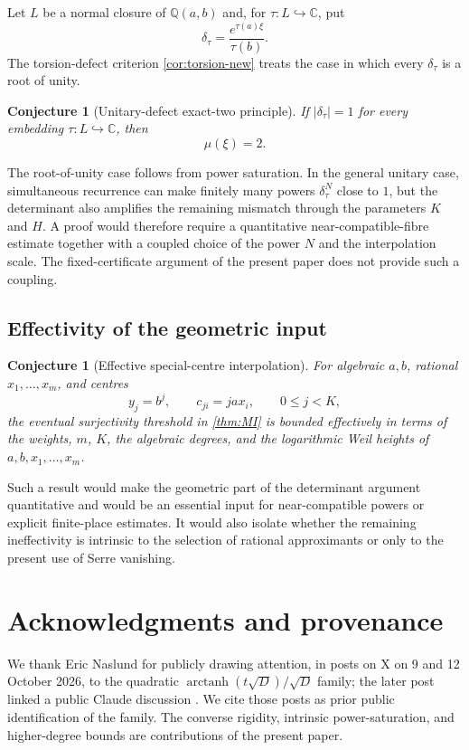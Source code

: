 \documentclass[11pt]{article}
\newcommand{\CC}{\mathbb C}
\newcommand{\QQ}{\mathbb Q}
\DeclareMathOperator{\arctanh}{arctanh}
\newtheorem{conjecture}[theorem]{Conjecture}
\theoremstyle{definition}
\theoremstyle{remark}
\numberwithin{equation}{section}
\begin{document}
Let $L$ be a normal closure of $\QQ(a,b)$ and, for
$\tau:L\hookrightarrow\CC$, put
\[
 \delta_\tau=\frac{e^{\tau(a)\xi}}{\tau(b)}.
\]
The torsion-defect criterion \cref{cor:torsion-new} treats the case in
which every $\delta_\tau$ is a root of unity.

\begin{conjecture}[Unitary-defect exact-two principle]
\label{conj:unitary-defect}
If $|\delta_\tau|=1$ for every embedding $\tau:L\hookrightarrow\CC$,
then
\[
 \boxed{\mu(\xi)=2.}
\]
\end{conjecture}

The root-of-unity case follows from power saturation.  In the general
unitary case, simultaneous recurrence can make finitely many powers
$\delta_\tau^N$ close to $1$, but the determinant also amplifies the
remaining mismatch through the parameters $K$ and $H$.  A proof would
therefore require a quantitative near-compatible-fibre estimate together
with a coupled choice of the power $N$ and the interpolation scale.  The
fixed-certificate argument of the present paper does not provide such a
coupling.

\subsection{Effectivity of the geometric input}

\begin{conjecture}[Effective special-centre interpolation]
\label{conj:effective-interpolation}
For algebraic $a,b$, rational $x_1,\ldots,x_m$, and centres
\[
 y_j=b^j,
 \qquad
 c_{ji}=ja x_i,
 \qquad 0\le j<K,
\]
the eventual surjectivity threshold in \cref{thm:MI} is bounded
effectively in terms of the weights, $m$, $K$, the algebraic degrees, and
the logarithmic Weil heights of $a,b,x_1,\ldots,x_m$.
\end{conjecture}

Such a result would make the geometric part of the determinant argument
quantitative and would be an essential input for near-compatible powers
or explicit finite-place estimates.  It would also isolate whether the
remaining ineffectivity is intrinsic to the selection of rational
approximants or only to the present use of Serre vanishing.

\section*{Acknowledgments and provenance}

We thank Eric Naslund for publicly drawing attention, in posts on X on
9 and 12 October 2026, to the quadratic
$\arctanh(t\sqrt D)/\sqrt D$ family; the later post linked a public
Claude discussion \cite{Naslund2026}.  We cite those posts as prior
public identification of the family.  The converse rigidity, intrinsic
power-saturation, and higher-degree bounds are contributions of the
present paper.
\end{document}
